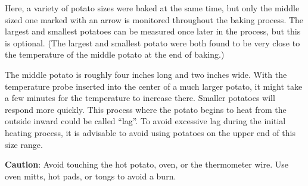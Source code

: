 \documentclass{ximera}
\begin{document}
Here, a variety of potato sizes were baked at the same time, but only the middle sized one marked with an arrow is monitored throughout the baking process.  The largest and smallest potatoes can be measured once later in the process, but this is optional.  (The largest and smallest potato were both found to be very close to the temperature of the middle potato at the end of baking.)
 
The middle potato is roughly four inches long and two inches wide.  With the temperature probe inserted into the center of a much larger potato, it might take a few minutes for the temperature to increase there.  Smaller potatoes will respond more quickly.  This process where the potato begins to heat from the outside inward could be called ``lag''.  To avoid excessive lag during the initial heating process, it is advisable to avoid using potatoes on the upper end of this size range.    

{\large \textbf{Caution}: Avoid touching the hot potato, oven, or the thermometer wire.  Use oven mitts, hot pads, or tongs to avoid a burn.}
\end{document}

